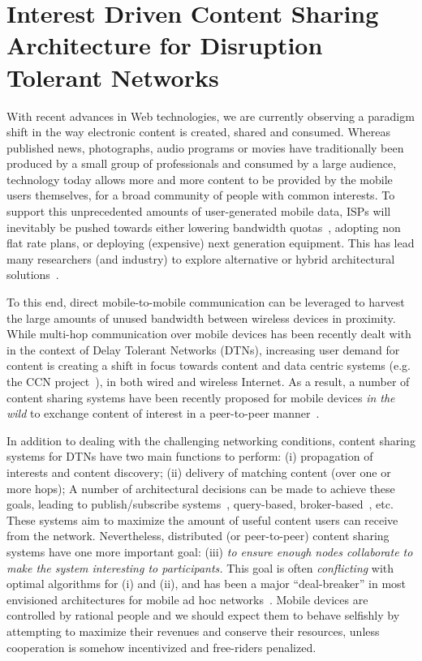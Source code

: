 \chapter{Interest Driven Content Sharing Architecture for Disruption Tolerant Networks}
\label{chapter:PTMP}
\minitoc

With recent advances in Web technologies, we are currently observing a paradigm shift in the way electronic content is created, shared and consumed. Whereas published news, photographs, audio programs or movies have traditionally been produced by a small group of professionals and consumed by a large audience, technology today allows more and more content to be provided by the mobile users themselves, for a broad community of people with common interests. To support this unprecedented amounts of user-generated mobile data, ISPs will inevitably be pushed towards either lowering bandwidth quotas~\cite{ATT}, adopting non flat rate plans, or deploying (expensive) next generation equipment. This has lead many researchers (and industry) to explore alternative or hybrid architectural solutions~\cite{CellOffLoading}.

To this end, direct mobile-to-mobile communication can be leveraged to harvest the large amounts of unused bandwidth between wireless devices in proximity. While multi-hop communication over mobile devices has been recently dealt with in the context of Delay Tolerant Networks (DTNs), increasing user demand for content is creating a shift in focus towards content and data centric systems (e.g. the CCN project~\cite{CCN}), in both wired and wireless Internet. As a result, a number of content sharing systems have been recently proposed for mobile devices \emph{in the wild} to exchange content of interest in a peer-to-peer manner~\cite{TACODTN, Peoplenet, podnet07, May07wirelessopportunistic, ContentPlace, OptimalChannelChoice, SocialCast, Boldrini:2008:MDD}.

In addition to dealing with the challenging networking conditions, content sharing systems for DTNs have two main functions to perform: (i) propagation of interests and content discovery; (ii) delivery of matching content (over one or more hops);
A number of architectural decisions can be made to achieve these goals, leading to publish/subscribe systems~\cite{TACODTN, Peoplenet}, query-based, broker-based~\cite{podnet07, LOCUS, May07wirelessopportunistic, ContentPlace, OptimalChannelChoice, SocialCast, Boldrini:2008:MDD}, etc. These systems aim to maximize the amount of useful content users can receive from the network. Nevertheless, distributed (or peer-to-peer) content sharing systems have one more important goal: (iii) \emph{to ensure enough nodes collaborate to make the system interesting to participants.} This goal is often \emph{conflicting} with optimal algorithms for (i) and (ii), and has been a major ``deal-breaker'' in most envisioned architectures for mobile ad hoc networks~\cite{NashEquilibria}. Mobile devices are controlled by rational people and we should expect them to behave selfishly by attempting to maximize their revenues and conserve their resources, unless cooperation is somehow incentivized and free-riders penalized.

